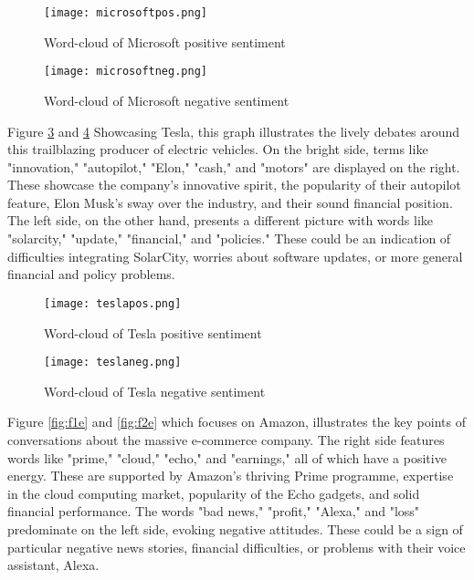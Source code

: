 \documentclass[12pt, a4paper,twoside]{report}
\theoremstyle{plain} %
\theoremstyle{definition} %
\theoremstyle{remark} %
\numberwithin{equation}{chapter}
\begin{document}
    \begin{figure}
      \centering
      \texttt{[image: microsoftpos.png]}\label{fig:f1c}
      \caption{Word-cloud of Microsoft positive sentiment}
    \end{figure}
    \begin{figure}
      \centering
      \texttt{[image: microsoftneg.png]}\label{fig:f2c}
      \caption{Word-cloud of Microsoft negative sentiment}
    \end{figure}

    Figure \ref{fig:f1d} and \ref{fig:f2d} Showcasing Tesla, this graph illustrates the lively debates around this trailblazing producer of electric vehicles. On the bright side, terms like "innovation," "autopilot," "Elon," "cash," and "motors" are displayed on the right. These showcase the company's innovative spirit, the popularity of their autopilot feature, Elon Musk's sway over the industry, and their sound financial position. The left side, on the other hand, presents a different picture with words like "solarcity," "update," "financial," and "policies." These could be an indication of difficulties integrating SolarCity, worries about software updates, or more general financial and policy problems.


    \begin{figure}
      \centering
      \texttt{[image: teslapos.png]}\label{fig:f1d}
      \caption{Word-cloud of Tesla positive  sentiment}
    \end{figure}
    \begin{figure}
      \centering
      \texttt{[image: teslaneg.png]}\label{fig:f2d}
      \caption{Word-cloud of Tesla negative sentiment}
    \end{figure}

    Figure \ref{fig:f1e} and \ref{fig:f2e} which focuses on Amazon, illustrates the key points of conversations about the massive e-commerce company. The right side features words like "prime," "cloud," "echo," and "earnings," all of which have a positive energy. These are supported by Amazon's thriving Prime programme, expertise in the cloud computing market, popularity of the Echo gadgets, and solid financial performance. The words "bad news," "profit," "Alexa," and "loss" predominate on the left side, evoking negative attitudes. These could be a sign of particular negative news stories, financial difficulties, or problems with their voice assistant, Alexa.
\end{document}

